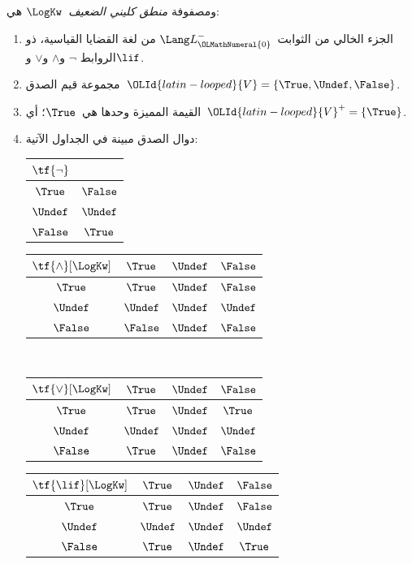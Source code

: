 \documentclass[../../../include/open-logic-section]{subfiles}
\begin{document}
\begin{defn}
ومصفوفة \emph{منطق كليني الضعيف}~$\LogKw$ هي:
\begin{enumerate}
  \item الجزء الخالي من الثوابت~$\Lang L_\OLMathNumeral{0}^{-}$ من لغة القضايا القياسية، ذو الروابط
  $\lnot$ و$\land$ و$\lor$ و$\lif$.
  \item مجموعة قيم الصدق~$\OLId{latin-looped}{V} = \{\True, \Undef, \False\}$.
  \item القيمة المميزة وحدها هي~$\True$؛ أي~$\OLId{latin-looped}{V}^+ = \{\True\}$.
  \item دوال الصدق مبينة في الجداول الآتية:
  \begin{center}
    \begin{tabular}{c|c}
      $\tf{\lnot}$ & \\
      \hline
      $\True$ & $\False$ \\
      $\Undef$ & $\Undef$ \\
      $\False$ & $\True$
    \end{tabular}
    \quad
    \begin{tabular}{c|ccc}
      $\tf{\land}[\LogKw]$ & $\True$ & $\Undef$ & $\False$ \\
      \hline
      $\True$ & $\True$ & $\Undef$ & $\False$ \\
      $\Undef$ & $\Undef$ & $\Undef$ & $\Undef$\\
      $\False$ & $\False$ & $\Undef$ & $\False$
    \end{tabular}
    \\[2ex]
    \begin{tabular}{c|ccc}
      $\tf{\lor}[\LogKw]$ & $\True$ & $\Undef$ & $\False$ \\
      \hline
      $\True$ & $\True$ & $\Undef$ & $\True$ \\
      $\Undef$ & $\Undef$ & $\Undef$ & $\Undef$ \\
      $\False$ & $\True$ & $\Undef$ & $\False$
    \end{tabular}
    \quad
    \begin{tabular}{c|ccc}
      $\tf{\lif}[\LogKw]$ & $\True$ & $\Undef$ & $\False$ \\
      \hline
      $\True$ & $\True$ & $\Undef$ & $\False$ \\
      $\Undef$ & $\Undef$ & $\Undef$ & $\Undef$  \\
      $\False$ & $\True$ & $\Undef$ & $\True$
    \end{tabular}
  \end{center}
\end{enumerate}
\end{defn}
\end{document}
